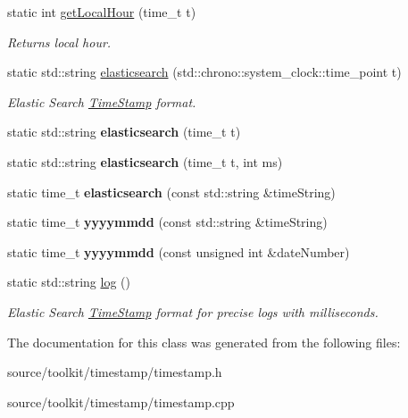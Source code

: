 \begin{DoxyCompactItemize}
static int \mbox{\hyperlink{classTimeStamp_aabcdf6d992a680d9da815f0a78683e59}{get\+Local\+Hour}} (time\+\_\+t t)
\begin{DoxyCompactList}\small\item\em Returns local hour. \end{DoxyCompactList}\item 
\mbox{\label{classTimeStamp_a456d0271b13636d11d6871bafe4c7f62}} 
static std\+::string \mbox{\hyperlink{classTimeStamp_a456d0271b13636d11d6871bafe4c7f62}{elasticsearch}} (std\+::chrono\+::system\+\_\+clock\+::time\+\_\+point t)
\begin{DoxyCompactList}\small\item\em Elastic Search \mbox{\hyperlink{classTimeStamp}{Time\+Stamp}} format. \end{DoxyCompactList}\item 
\mbox{\label{classTimeStamp_a0e829646c9d7366ba987f977a42ab191}} 
static std\+::string {\bfseries elasticsearch} (time\+\_\+t t)
\item 
\mbox{\label{classTimeStamp_abe1a70441d20385f4ca4ddec07ef9342}} 
static std\+::string {\bfseries elasticsearch} (time\+\_\+t t, int ms)
\item 
\mbox{\label{classTimeStamp_a8e8f74521e03cabed287f5ffffd4d518}} 
static time\+\_\+t {\bfseries elasticsearch} (const std\+::string \&time\+String)
\item 
\mbox{\label{classTimeStamp_ae61c2b60ddae2ef62051af03b6ca387e}} 
static time\+\_\+t {\bfseries yyyymmdd} (const std\+::string \&time\+String)
\item 
\mbox{\label{classTimeStamp_a14f4c3194f3e3caec6082eb00a6f0263}} 
static time\+\_\+t {\bfseries yyyymmdd} (const unsigned int \&date\+Number)
\item 
\mbox{\label{classTimeStamp_ac18cb68d8341ea6d2c551b1ad5781394}} 
static std\+::string \mbox{\hyperlink{classTimeStamp_ac18cb68d8341ea6d2c551b1ad5781394}{log}} ()
\begin{DoxyCompactList}\small\item\em Elastic Search \mbox{\hyperlink{classTimeStamp}{Time\+Stamp}} format for precise logs with milliseconds. \end{DoxyCompactList}\end{DoxyCompactItemize}


The documentation for this class was generated from the following files\+:\begin{DoxyCompactItemize}
\item 
source/toolkit/timestamp/timestamp.\+h\item 
source/toolkit/timestamp/timestamp.\+cpp\end{DoxyCompactItemize}
